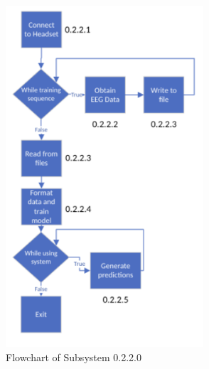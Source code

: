 \documentclass[conference]{IEEEtran}
\begin{document}
    \begin{figure}[htbp]
            \centerline{\includegraphics[height=5in,keepaspectratio]{figs/F/0.2.2_flowchart.png}}
            \caption{Flowchart of Subsystem 0.2.2.0}
            \label{fig:0.2.2.0_flowchart}
        \end{figure} 
\end{document}
